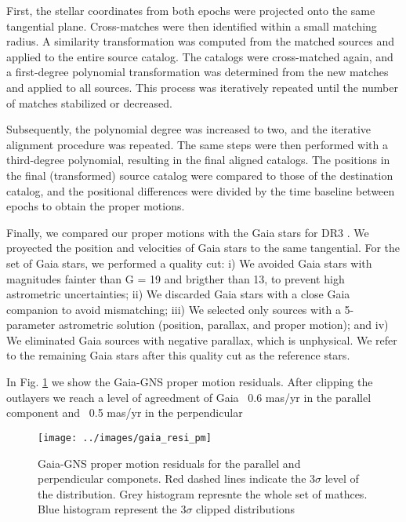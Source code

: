 \documentclass{aa} %
\begin{document}
	First, the stellar coordinates from both epochs were projected onto the same tangential plane. Cross-matches were then identified within a small matching radius. A similarity transformation was computed from the matched sources and applied to the entire source catalog. The catalogs were cross-matched again, and a first-degree polynomial transformation was determined from the new matches and applied to all sources. This process was iteratively repeated until the number of matches stabilized or decreased. 
	
	Subsequently, the polynomial degree was increased to two, and the iterative alignment procedure was repeated. The same steps were then performed with a third-degree polynomial, resulting in the final aligned catalogs. The positions in the final (transformed) source catalog were compared to those of the destination catalog, and the positional differences were divided by the time baseline between epochs to obtain the proper motions. 
	
	
	Finally, we compared our proper motions with the Gaia stars for DR3 \citep{GDR3}. We proyected the position and velocities of Gaia stars to the same tangential. For the set of Gaia stars, we performed a quality cut: i) We avoided Gaia stars with magnitudes fainter than G = 19 and brigther than 13, to prevent high astrometric uncertainties; ii) We discarded Gaia stars with a close Gaia companion to avoid mismatching; iii) We selected only sources with a 5-parameter astrometric solution (position, parallax, and proper motion); and iv) We eliminated Gaia sources with negative parallax, which is unphysical. We refer to the remaining Gaia stars after this quality cut as the reference stars. 
	
	In Fig. \ref{fig:gaiaresipm} we show the Gaia-GNS proper motion residuals. After clipping the outlayers we reach a level of agreedment of Gaia ~0.6 mas/yr in the parallel component and   ~0.5 mas/yr in the perpendicular
	 
	 \begin{figure}
	 	\centering
	 	\texttt{[image: ../images/gaia\_resi\_pm]}
	 	\caption{Gaia-GNS proper motion residuals for the parallel and perpendicular componets. Red dashed lines indicate the 3$\sigma$ level of the distribution. Grey histogram represnte the whole set of mathces. Blue histogram represent the 3$\sigma$ clipped distributions}
	 	\label{fig:gaiaresipm}
	 \end{figure}
	 
	
\end{document}
